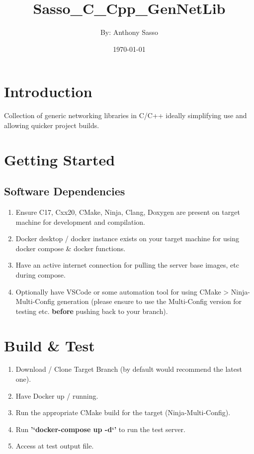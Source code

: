 \documentclass{article}
\title      {\Huge Sasso\_C\_Cpp\_GenNetLib}
\author     {By: Anthony Sasso}
\date       {\today}
\begin{document}
\maketitle

\tableofcontents

\newpage
\section{Introduction}
Collection of generic networking libraries in C/C++ ideally simplifying use and allowing quicker project builds.

\section{Getting Started}
\subsection{Software Dependencies}
\begin{enumerate}
    \item Ensure C17, Cxx20, CMake, Ninja, Clang, Doxygen are present on target machine for development and compilation.
    \item Docker desktop / docker instance exists on your target machine for using docker compose \& docker functions.
    \item Have an active internet connection for pulling the server base images, etc during compose.
    \item Optionally have VSCode or some automation tool for using CMake > Ninja-Multi-Config generation (please ensure to use the Multi-Config version for testing etc. \textbf{before} pushing back to your branch).
\end{enumerate}

\section{Build \& Test}
\begin{enumerate}
    \item Download / Clone Target Branch (by default would recommend the latest one).
    \item Have Docker up / running.
    \item Run the appropriate CMake build for the target (Ninja-Multi-Config).
    \item Run \textbf{'`docker-compose up -d`'} to run the test server.
    \item Access at test output file.
\end{enumerate}
\end{document}
